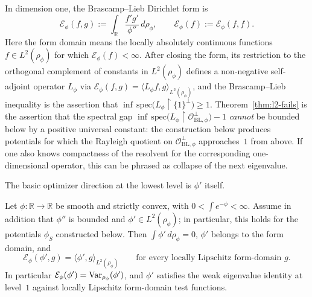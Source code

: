 In dimension one, the Brascamp--Lieb Dirichlet form is
\begin{equation}\label{eq:BL-form}
  \mathcal E_\phi(f,g)
  := \int_{\mathbb R}\frac{f'g'}{\phi''}\,d\rho_\phi,
  \qquad
  \mathcal E_\phi(f) := \mathcal E_\phi(f,f).
\end{equation}
Here the form domain means the locally absolutely continuous functions
$f\in L^2(\rho_\phi)$ for which $\mathcal E_\phi(f)<\infty$.
After closing the form, its restriction to the orthogonal complement of
constants in $L^2(\rho_\phi)$ defines a non-negative self-adjoint operator
$L_\phi$ via
$\mathcal E_\phi(f,g)=\langle L_\phi f,g\rangle_{L^2(\rho_\phi)}$, and the
Brascamp--Lieb inequality is the assertion that
$\inf\,\mathrm{spec}\bigl(L_\phi\restriction\{1\}^\perp\bigr)\ge 1$.
Theorem~\ref{thm:l2-fails} is the assertion that the spectral gap
$\inf\,\mathrm{spec}\bigl(L_\phi\restriction \mathcal O_{\mathrm{BL},\phi}^\perp\bigr)-1$
\emph{cannot} be bounded below by a positive universal constant: the
construction below produces potentials for which the Rayleigh quotient on
$\mathcal O_{\mathrm{BL},\phi}^\perp$ approaches~$1$ from above. If one also
knows compactness of the resolvent for the corresponding one-dimensional
operator, this can be phrased as collapse of the next eigenvalue.

The basic optimizer direction at the lowest level is $\phi'$ itself.

\begin{lemma}\label{lem:phi-prime-eigen}
Let $\phi:\mathbb R\to\mathbb R$ be smooth and strictly convex, with
$0<\int e^{-\phi}<\infty$. Assume in addition that $\phi''$ is bounded and
$\phi'\in L^2(\rho_\phi)$; in particular, this holds for the potentials
$\phi_S$ constructed below. Then $\int\phi'\,d\rho_\phi=0$, $\phi'$ belongs to
the form domain, and
\[
  \mathcal E_\phi(\phi',g)=\langle\phi',g\rangle_{L^2(\rho_\phi)}
  \qquad\text{for every locally Lipschitz form-domain }g.
\]
In particular $\mathcal E_\phi(\phi')=\operatorname{Var}_{\rho_\phi}(\phi')$, and
$\phi'$ satisfies the weak eigenvalue identity at level~$1$ against locally
Lipschitz form-domain test functions.
\end{lemma}

